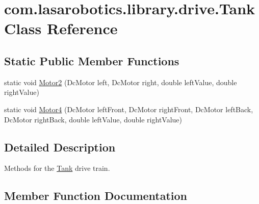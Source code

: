 \hypertarget{classcom_1_1lasarobotics_1_1library_1_1drive_1_1_tank}{}\section{com.\+lasarobotics.\+library.\+drive.\+Tank Class Reference}
\label{classcom_1_1lasarobotics_1_1library_1_1drive_1_1_tank}
\subsection*{Static Public Member Functions}
\begin{DoxyCompactItemize}
\item 
static void \hyperlink{classcom_1_1lasarobotics_1_1library_1_1drive_1_1_tank_ad00f8c122db08fdf3399e10a50dabede}{Motor2} (Dc\+Motor left, Dc\+Motor right, double left\+Value, double right\+Value)
\item 
static void \hyperlink{classcom_1_1lasarobotics_1_1library_1_1drive_1_1_tank_a49450548769799647ee538ea4e8a7d01}{Motor4} (Dc\+Motor left\+Front, Dc\+Motor right\+Front, Dc\+Motor left\+Back, Dc\+Motor right\+Back, double left\+Value, double right\+Value)
\end{DoxyCompactItemize}


\subsection{Detailed Description}
Methods for the \hyperlink{classcom_1_1lasarobotics_1_1library_1_1drive_1_1_tank}{Tank} drive train. 

\subsection{Member Function Documentation}
\hypertarget{classcom_1_1lasarobotics_1_1library_1_1drive_1_1_tank_ad00f8c122db08fdf3399e10a50dabede}{}

